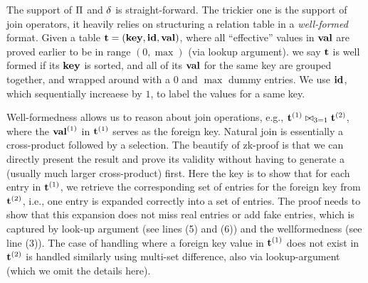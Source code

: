 The support of $\Pi$ and $\delta$ is straight-forward. 
The trickier one is the support of join operators, it heavily
relies on structuring a relation table in a {\em well-formed}
format. 
Given a table ${{\mathbf {t}}} = ({{\mathbf {key}}}, {{\mathbf {id}}}, {{\mathbf {val}}})$,
where all ``effective'' values in ${{\mathbf {val}}}$ are proved earlier
to be in range $(0,\max)$ (via lookup argument).
we say ${{\mathbf {t}}}$ is well formed if its ${{\mathbf {key}}}$ is sorted, and
all of its ${{\mathbf {val}}}$ for the same key are grouped together,
and wrapped around with a $0$ and $\max$ dummy entries.
We use ${{\mathbf {id}}}$, which sequentially increaese by $1$,
to label the values for a same key. 

Well-formedness allows us to
reason about join operations, e.g., ${{\mathbf {t}}}^{(1)} \bowtie_{3=1}
{{\mathbf {t}}}^{(2)}$, where
the ${{\mathbf {val}}}^{(1)}$ in ${{\mathbf {t}}}^{(1)}$ serves as the
foreign key. Natural join is essentially
a cross-product followed by a selection. The beautify of zk-proof
is that we can directly present the result and prove its validity
without having to generate a (usually much larger cross-product) first.
Here the key is to show that for each entry in ${{\mathbf {t}}}^{(1)}$,
we retrieve the corresponding set of entries for the foreign key
from ${{\mathbf {t}}}^{(2)}$, i.e., one entry is expanded correctly
into a set of entries. The proof needs to show that
this expansion does not miss real entries or add fake entries,
which is captured by look-up argument (see lines (5) and (6))
and the wellformedness (see line (3)). The case of handling
where a foreign key value in ${{\mathbf {t}}}^{(1)}$ does not exist
in ${{\mathbf {t}}}^{(2)}$ is handled similarly using multi-set difference,
also via lookup-argument (which we omit the details here).



